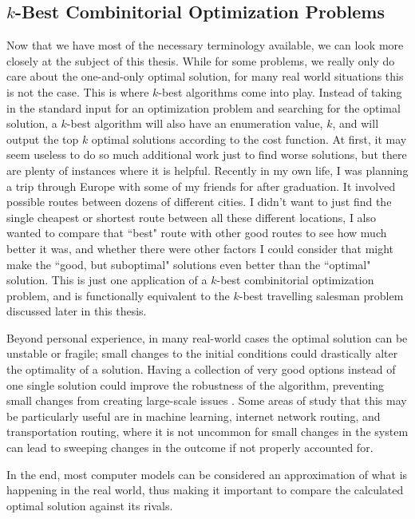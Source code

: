\subsection{$k$-Best Combinitorial Optimization Problems}
Now that we have most of the necessary terminology available, we can look more closely at the subject of this thesis. While for some problems, we really only do care about the one-and-only optimal solution, for many real world situations this is not the case. This is where $k$-best algorithms come into play. Instead of taking in the standard input for an optimization problem and searching for the optimal solution, a $k$-best algorithm will also have an enumeration value, $k$, and will output the top $k$ optimal solutions according to the cost function. At first, it may seem useless to do so much additional work just to find worse solutions, but there are plenty of instances where it is helpful. Recently in my own life, I was planning a trip through Europe with some of my friends for after graduation. It involved possible routes between dozens of different cities. I didn't want to just find the single cheapest or shortest route between all these different locations, I also wanted to compare that ``best" route with other good routes to see how much better it was, and whether there were other factors I could consider that might make the ``good, but suboptimal" solutions even better than the ``optimal" solution. This is just one application of a $k$-best combinitorial optimization problem, and is functionally equivalent to the $k$-best travelling salesman problem discussed later in this thesis.

Beyond personal experience, in many real-world cases the optimal solution can be unstable or fragile; small changes to the initial conditions could drastically alter the optimality of a solution. Having a collection of very good options instead of one single solution could improve the robustness of the algorithm, preventing small changes from creating large-scale issues \cite{kurtz2023approximation, kalyanmoy2006in}. Some areas of study that this may be particularly useful are in machine learning, internet network routing, and transportation routing, where it is not uncommon for small changes in the system can lead to sweeping changes in the outcome if not properly accounted for. 

In the end, most computer models can be considered an approximation of what is happening in the real world, thus making it important to compare the calculated optimal solution against its rivals. 
